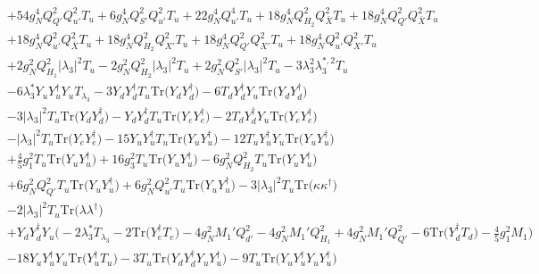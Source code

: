 {\begin{align}
 &+54 g_{N}^{4} Q_{Q'}^{2} Q_{u'}^{2} T_u +6 g_{N}^{4} Q_{S'}^{2} Q_{u'}^{2} T_u +22 g_{N}^{4} Q_{u'}^{4} T_u +18 g_{N}^{4} Q_{H_2}^{2} Q_{\bar{X}}^{2} T_u +18 g_{N}^{4} Q_{Q'}^{2} Q_{\bar{X}}^{2} T_u \nonumber \\ 
 &+18 g_{N}^{4} Q_{u'}^{2} Q_{\bar{X}}^{2} T_u +18 g_{N}^{4} Q_{H_2}^{2} Q_{X'}^{2} T_u +18 g_{N}^{4} Q_{Q'}^{2} Q_{X'}^{2} T_u +18 g_{N}^{4} Q_{u'}^{2} Q_{X'}^{2} T_u \nonumber \\ 
 &+2 g_{N}^{2} Q_{H_1}^{2} |\lambda_3|^2 T_u -2 g_{N}^{2} Q_{H_2}^{2} |\lambda_3|^2 T_u +2 g_{N}^{2} Q_{S'}^{2} |\lambda_3|^2 T_u -3 \lambda_{3}^{2} \lambda_{3}^{*,2} T_u \nonumber \\ 
 &-6 \lambda_3^* {Y_u  Y_{u}^{\dagger}  Y_u} T_{\lambda_3} -3 {Y_d  Y_{d}^{\dagger}  T_u} \mbox{Tr}\Big({Y_d  Y_{d}^{\dagger}}\Big) -6 {T_d  Y_{d}^{\dagger}  Y_u} \mbox{Tr}\Big({Y_d  Y_{d}^{\dagger}}\Big) \nonumber \\ 
 &-3 |\lambda_3|^2 T_u \mbox{Tr}\Big({Y_d  Y_{d}^{\dagger}}\Big) - {Y_d  Y_{d}^{\dagger}  T_u} \mbox{Tr}\Big({Y_e  Y_{e}^{\dagger}}\Big) -2 {T_d  Y_{d}^{\dagger}  Y_u} \mbox{Tr}\Big({Y_e  Y_{e}^{\dagger}}\Big) \nonumber \\ 
 &- |\lambda_3|^2 T_u \mbox{Tr}\Big({Y_e  Y_{e}^{\dagger}}\Big) -15 {Y_u  Y_{u}^{\dagger}  T_u} \mbox{Tr}\Big({Y_u  Y_{u}^{\dagger}}\Big) -12 {T_u  Y_{u}^{\dagger}  Y_u} \mbox{Tr}\Big({Y_u  Y_{u}^{\dagger}}\Big) \nonumber \\ 
 &+\frac{4}{5} g_{1}^{2} T_u \mbox{Tr}\Big({Y_u  Y_{u}^{\dagger}}\Big) +16 g_{3}^{2} T_u \mbox{Tr}\Big({Y_u  Y_{u}^{\dagger}}\Big) -6 g_{N}^{2} Q_{H_2}^{2} T_u \mbox{Tr}\Big({Y_u  Y_{u}^{\dagger}}\Big) \nonumber \\ 
 &+6 g_{N}^{2} Q_{Q'}^{2} T_u \mbox{Tr}\Big({Y_u  Y_{u}^{\dagger}}\Big) +6 g_{N}^{2} Q_{u'}^{2} T_u \mbox{Tr}\Big({Y_u  Y_{u}^{\dagger}}\Big) -3 |\lambda_3|^2 T_u \mbox{Tr}\Big({\kappa  \kappa^{\dagger}}\Big) \nonumber \\ 
 &-2 |\lambda_3|^2 T_u \mbox{Tr}\Big({\lambda  \lambda^{\dagger}}\Big) \nonumber \\ 
 &+{Y_d  Y_{d}^{\dagger}  Y_u} \Big(-2 \lambda_3^* T_{\lambda_3}  -2 \mbox{Tr}\Big({Y_{e}^{\dagger}  T_e}\Big)  -4 g_{N}^{2} M_1' Q_{d'}^{2}  -4 g_{N}^{2} M_1' Q_{H_1}^{2}  + 4 g_{N}^{2} M_1' Q_{Q'}^{2}  -6 \mbox{Tr}\Big({Y_{d}^{\dagger}  T_d}\Big)  -\frac{4}{5} g_{1}^{2} M_1 \Big)\nonumber \\ 
 &-18 {Y_u  Y_{u}^{\dagger}  Y_u} \mbox{Tr}\Big({Y_{u}^{\dagger}  T_u}\Big) -3 T_u \mbox{Tr}\Big({Y_d  Y_{d}^{\dagger}  Y_u  Y_{u}^{\dagger}}\Big) -9 T_u \mbox{Tr}\Big({Y_u  Y_{u}^{\dagger}  Y_u  Y_{u}^{\dagger}}\Big) \nonumber \\ 

\end{align}}
